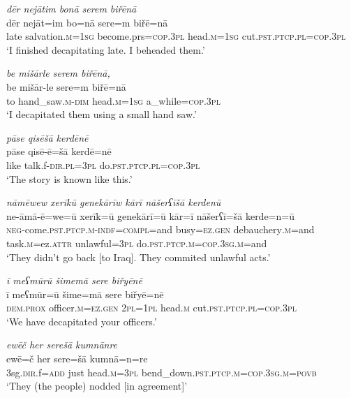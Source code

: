 \ea \label{BP.83}
\textit{dēr nejātim bonā serem biřēnā} \\ 
\gll dēr nejāt=im bo=nā sere=m biřē=nā \\ 
 late salvation\textsc{.m}\textsc{=\textsc{1sg}} become.prs\textsc{=cop}\textsc{.3pl} head\textsc{.m}\textsc{=\textsc{1sg}} cut\textsc{.pst}\textsc{.ptcp}\textsc{.pl}\textsc{=cop}\textsc{.3pl} \\ 
\glt `I finished decapitating late. I beheaded them.'
\z 
 
\ea \label{BP.84}
\textit{be mišārle serem biřēnā,} \\ 
\gll be mišār-le sere=m biřē=nā \\ 
 to hand\_saw\textsc{.m}\textsc{-dim} head\textsc{.m}\textsc{=\textsc{1sg}} a\_while\textsc{=cop}\textsc{.3pl} \\ 
\glt `I decapitated them using a small hand saw.'
\z 
 
\ea \label{BP.85}
\textit{pāse qisēšā kerdēnē} \\ 
\gll pāse qisē-ē=šā kerdē=nē \\ 
 like talk.f\textsc{-dir}\textsc{.pl}\textsc{=3pl} do\textsc{.pst}\textsc{.ptcp}\textsc{.pl}\textsc{=cop}\textsc{.3pl} \\ 
\glt `The story is known like this.'
\z 
 
\ea \label{BP.94}
\textit{nāmēwew xerīkū genekārīw kārī nāšerʕīšā kerdenū} \\ 
\gll ne-āmā-ē=we=ū xerīk=ū genekārī=ū kār=ī nāšerʕī=šā kerde=n=ū \\ 
 \textsc{neg-}come\textsc{.pst}\textsc{.ptcp}\textsc{.m}\textsc{-indf}\textsc{=compl}=and busy\textsc{=ez.gen} debauchery\textsc{.m}=and task\textsc{.m}=ez.\textsc{attr} unlawful\textsc{=3pl} do\textsc{.pst}\textsc{.ptcp}\textsc{.m}\textsc{=cop}\textsc{.3sg}\textsc{.m}=and \\ 
\glt `They didn’t go back [to Iraq]. They commited unlawful acts.'
\z 
 
\ea \label{BP.96}
\textit{ī meʕmūrū šimemā sere biřyēnē} \\ 
\gll ī meʕmūr=ū šime=mā sere biřyē=nē \\ 
 \textsc{dem.prox} officer\textsc{.m}\textsc{=ez.gen} \textsc{2pl}\textsc{=\textsc{1pl}} head\textsc{.m} cut\textsc{.pst}\textsc{.ptcp}\textsc{.pl}\textsc{=cop}\textsc{.3pl} \\ 
\glt `We have decapitated your officers.'
\z 
 
\ea \label{BP.104}
\textit{ewēč her serešā kumnānre} \\ 
\gll ewē=č her sere=šā kumnā=n=re \\ 
 3sg\textsc{.dir}.f\textsc{=add} just head\textsc{.m}\textsc{=3pl} bend\_down\textsc{.pst}\textsc{.ptcp}\textsc{.m}\textsc{=cop}\textsc{.3sg}\textsc{.m}\textsc{=\textsc{povb}} \\ 
\glt `They (the people) nodded [in agreement]'
\z 
 
